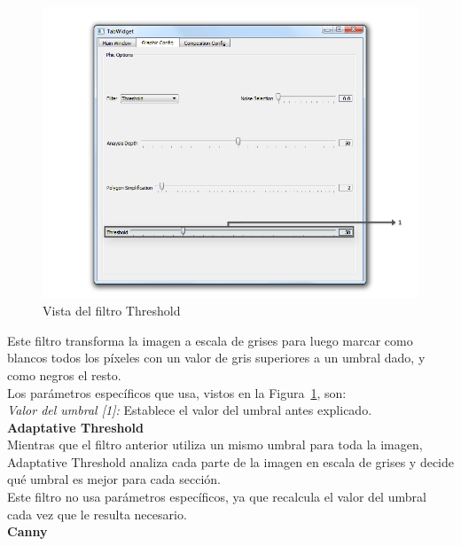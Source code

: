 		\begin{figure}[htbp]
		\centering
		\hspace*{-0.9in}
		\includegraphics[scale=0.57]{graphics/interfazthreshold.png}
		\caption{Vista del filtro Threshold}
		\label{fig:interfazthreshold}
		\end{figure}
		
		Este filtro transforma la imagen a escala de grises para luego marcar como blancos todos los píxeles con un valor de gris superiores a un umbral dado, y como negros el resto.\\
		
		Los parámetros específicos que usa, vistos en la Figura~\ref{fig:interfazthreshold}, son:\\		
		
		\noindent\textit{Valor del umbral [1]:} Establece el valor del umbral antes explicado.\\
		
	\noindent\textbf{Adaptative Threshold}\\

		Mientras que el filtro anterior utiliza un mismo umbral para toda la imagen, Adaptative Threshold analiza cada parte de la imagen en escala de grises y decide qué umbral es mejor para cada sección.\\ 
		
		Este filtro no usa parámetros específicos, ya que recalcula el valor del umbral cada vez que le resulta necesario.\\
		
	\noindent\textbf{Canny}\\

